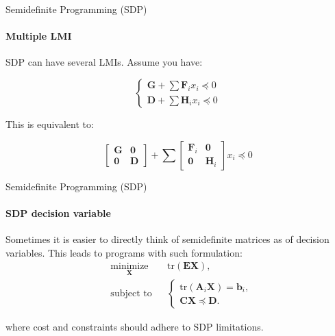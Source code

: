 \documentclass{beamer}
\begin{document}
\begin{frame}{Semidefinite Programming (SDP)}
\framesubtitle{Multiple LMI}
\begin{flushleft}

SDP can have several LMIs. Assume you have:

\begin{equation}
    \begin{cases}
        \mathbf{G} + \sum \mathbf{F}_i x_i \preceq 0 \\
        \mathbf{D} + \sum \mathbf{H}_i x_i \preceq 0
    \end{cases}
\end{equation}


This is equivalent to:

\begin{equation}
    \begin{bmatrix} 
            \mathbf{G} & \mathbf{0} \\
            \mathbf{0} & \mathbf{D}
    \end{bmatrix} +
    \sum
    \begin{bmatrix} 
            \mathbf{F}_i & \mathbf{0} \\
            \mathbf{0}   & \mathbf{H}_i
    \end{bmatrix}
    x_i \preceq 0
\end{equation}

\end{flushleft}
\end{frame}




\begin{frame}{Semidefinite Programming (SDP)}
\framesubtitle{SDP decision variable}
\begin{flushleft}

Sometimes it is easier to directly think of semidefinite matrices as of decision variables. This leads to programs with such formulation:
%
\begin{equation}
\begin{aligned}
& \underset{\mathbf{X}}{\text{minimize}}
& & \text{tr}(\mathbf{E}\mathbf{X}), \\
& \text{subject to}
& & \begin{cases}
     \text{tr}(\mathbf{A}_i\mathbf{X}) =  \mathbf{b}_i, \\
     \mathbf{C}\mathbf{X} \preceq \mathbf{D}.
    \end{cases}
\end{aligned}
\end{equation}

where cost and constraints should adhere to SDP limitations.

\end{flushleft}
\end{frame}
\end{document}
